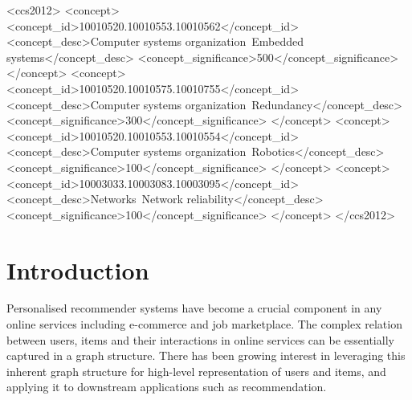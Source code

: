 \documentclass[manuscript,screen,review]{acmart}
\begin{document}
\begin{CCSXML}
<ccs2012>
 <concept>
  <concept_id>10010520.10010553.10010562</concept_id>
  <concept_desc>Computer systems organization~Embedded systems</concept_desc>
  <concept_significance>500</concept_significance>
 </concept>
 <concept>
  <concept_id>10010520.10010575.10010755</concept_id>
  <concept_desc>Computer systems organization~Redundancy</concept_desc>
  <concept_significance>300</concept_significance>
 </concept>
 <concept>
  <concept_id>10010520.10010553.10010554</concept_id>
  <concept_desc>Computer systems organization~Robotics</concept_desc>
  <concept_significance>100</concept_significance>
 </concept>
 <concept>
  <concept_id>10003033.10003083.10003095</concept_id>
  <concept_desc>Networks~Network reliability</concept_desc>
  <concept_significance>100</concept_significance>
 </concept>
</ccs2012>
\end{CCSXML}




\maketitle

\section{Introduction}
Personalised recommender systems have become a crucial component in any online services including e-commerce and job marketplace. The complex relation between users, items and their interactions in online services can be essentially captured in a graph structure. There has been growing interest in leveraging this inherent graph structure for high-level representation of users and items, and applying it to downstream applications such as recommendation.
\end{document}
